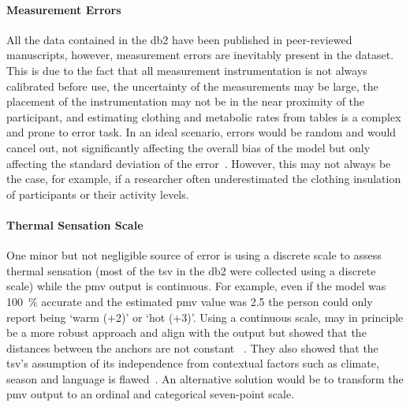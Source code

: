\paragraph{Measurement Errors}
All the data contained in the \ac{db2} have been published in peer-reviewed manuscripts, however, measurement errors are inevitably present in the dataset.
This is due to the fact that all measurement instrumentation is not always calibrated before use, the uncertainty of the measurements may be large, the placement of the instrumentation may not be in the near proximity of the participant, and estimating clothing and metabolic rates from tables is a complex and prone to error task.
In an ideal scenario, errors would be random and would cancel out, not significantly affecting the overall bias of the model but only affecting the standard deviation of the error~\cite{Humphreys2002}.
However, this may not always be the case, for example, if a researcher often underestimated the clothing insulation of participants or their activity levels.

\paragraph{Thermal Sensation Scale}
One minor but not negligible source of error is using a discrete scale to assess thermal sensation (most of the \ac{tsv} in the \ac{db2} were collected using a discrete scale) while the \ac{pmv} output is continuous.
For example, even if the model was 100~\% accurate and the estimated \ac{pmv} value was \num{2.5} the person could only report being `warm (+2)' or `hot (+3)'.
Using a continuous scale, may in principle be a more robust approach and align with the output but  showed that the distances between the anchors are not constant ~\cite{schweiker2019scales, schweiker2020evaluating}.
They also showed that the \ac{tsv}'s assumption of its independence from contextual factors such as climate, season and language is flawed~\cite{schweiker2019scales, schweiker2020evaluating}.
An alternative solution would be to transform the \ac{pmv} output to an ordinal and categorical seven-point scale.

